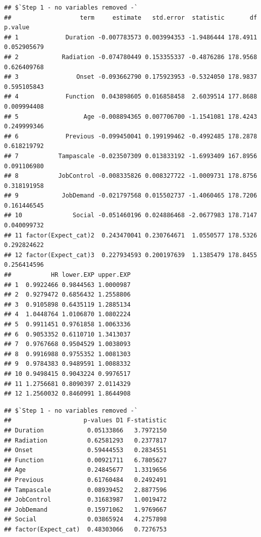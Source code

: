 \documentclass[
]{book}
\newenvironment{Shaded}{\begin{snugshade}}{\end{snugshade}}
\newcommand{\NormalTok}[1]{#1}
\newcommand{\SpecialCharTok}[1]{\textcolor[rgb]{0.00,0.00,0.00}{#1}}
\begin{document}
\begin{verbatim}
## $`Step 1 - no variables removed -`
##                   term     estimate   std.error  statistic       df     p.value
## 1             Duration -0.007783573 0.003994353 -1.9486444 178.4911 0.052905679
## 2            Radiation -0.074780449 0.153355337 -0.4876286 178.9568 0.626409768
## 3                Onset -0.093662790 0.175923953 -0.5324050 178.9837 0.595105843
## 4             Function  0.043898605 0.016858458  2.6039514 177.8688 0.009994408
## 5                  Age -0.008894365 0.007706700 -1.1541081 178.4243 0.249999346
## 6             Previous -0.099450041 0.199199462 -0.4992485 178.2878 0.618219792
## 7           Tampascale -0.023507309 0.013833192 -1.6993409 167.8956 0.091106980
## 8           JobControl -0.008335826 0.008327722 -1.0009731 178.8756 0.318191958
## 9            JobDemand -0.021797568 0.015502737 -1.4060465 178.7206 0.161446545
## 10              Social -0.051460196 0.024886468 -2.0677983 178.7147 0.040099732
## 11 factor(Expect_cat)2  0.243470041 0.230764671  1.0550577 178.5326 0.292824622
## 12 factor(Expect_cat)3  0.227934593 0.200197639  1.1385479 178.8455 0.256414596
##           HR lower.EXP upper.EXP
## 1  0.9922466 0.9844563 1.0000987
## 2  0.9279472 0.6856432 1.2558806
## 3  0.9105898 0.6435119 1.2885134
## 4  1.0448764 1.0106870 1.0802224
## 5  0.9911451 0.9761858 1.0063336
## 6  0.9053352 0.6110710 1.3413037
## 7  0.9767668 0.9504529 1.0038093
## 8  0.9916988 0.9755352 1.0081303
## 9  0.9784383 0.9489591 1.0088332
## 10 0.9498415 0.9043224 0.9976517
## 11 1.2756681 0.8090397 2.0114329
## 12 1.2560032 0.8460991 1.8644908
\end{verbatim}

\begin{Shaded}
\end{Shaded}

\begin{verbatim}
## $`Step 1 - no variables removed -`
##                    p-values D1 F-statistic
## Duration            0.05133866   3.7972150
## Radiation           0.62581293   0.2377817
## Onset               0.59444553   0.2834551
## Function            0.00921711   6.7805627
## Age                 0.24845677   1.3319656
## Previous            0.61760484   0.2492491
## Tampascale          0.08939452   2.8877596
## JobControl          0.31683987   1.0019472
## JobDemand           0.15971062   1.9769667
## Social              0.03865924   4.2757898
## factor(Expect_cat)  0.48303066   0.7276753
\end{verbatim}
\end{document}
